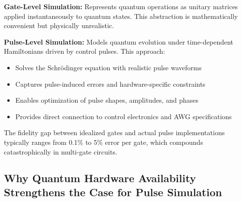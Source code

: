 \documentclass[12pt,a4paper]{article}
\begin{document}
\textbf{Gate-Level Simulation:} Represents quantum operations as unitary matrices applied instantaneously to quantum states. This abstraction is mathematically convenient but physically unrealistic.

\textbf{Pulse-Level Simulation:} Models quantum evolution under time-dependent Hamiltonians driven by control pulses. This approach:
\begin{itemize}[noitemsep]
    \item Solves the Schrödinger equation with realistic pulse waveforms
    \item Captures pulse-induced errors and hardware-specific constraints
    \item Enables optimization of pulse shapes, amplitudes, and phases
    \item Provides direct connection to control electronics and AWG specifications
\end{itemize}

The fidelity gap between idealized gates and actual pulse implementations typically ranges from 0.1\% to 5\% error per gate, which compounds catastrophically in multi-gate circuits.

\subsection{Why Quantum Hardware Availability Strengthens the Case for Pulse Simulation}
\end{document}
